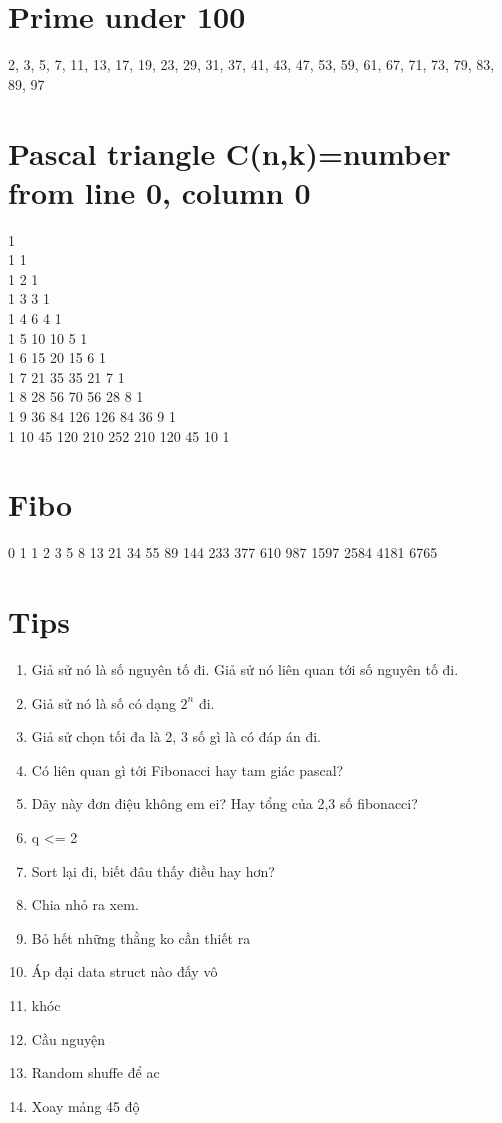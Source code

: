 \documentclass[A4 paper, 12pt]{article}
\begin{document}
	\section{Prime under 100}
	2, 3, 5, 7, 11, 13, 17, 19, 23, 29, 31, 37, 41, 43, 47, 53, 59, 61, 67, 71, 73, 79, 83, 89, 97 
	\section{Pascal triangle C(n,k)=number from line 0, column 0}
1\\
1 1\\
1 2 1\\ 
1 3 3 1\\ 
1 4 6 4 1\\ 
1 5 10 10 5 1\\ 
1 6 15 20 15 6 1\\ 
1 7 21 35 35 21 7 1\\
1 8 28 56 70 56 28 8 1\\ 
1 9 36 84 126 126 84 36 9 1\\
1 10 45 120 210 252 210 120 45 10 1
	\section{Fibo}
	0 1 1 2 3 5 8 13 21 34 55 89 144 233 377 610 987 1597 2584 4181 6765
	\section{Tips}
	\begin{enumerate}[topsep=0pt, partopsep=0pt, itemsep=0pt]
	\item Giả sử nó là số nguyên tố đi. Giả sử nó liên quan tới số nguyên tố đi.\\
	\item Giả sử nó là số có dạng \(2^n\) đi.\\
	\item Giả sử chọn tối đa là 2, 3 số gì là có đáp án đi.\\
	\item Có liên quan gì tới Fibonacci hay tam giác pascal?\\
	\item Dãy này đơn điệu không em ei? Hay tổng của 2,3 số fibonacci?\\
	\item q <= 2\\
	\item Sort lại đi, biết đâu thấy điều hay hơn?\\
	\item Chia nhỏ ra xem.\\
	\item Bỏ hết những thằng ko cần thiết ra\\
	\item Áp đại data struct nào đấy vô\\
	\item khóc\\
	\item Cầu nguyện\\
	\item Random shuffe để ac\\
	\item Xoay mảng 45 độ\\
	\end{enumerate}
\end{document}
